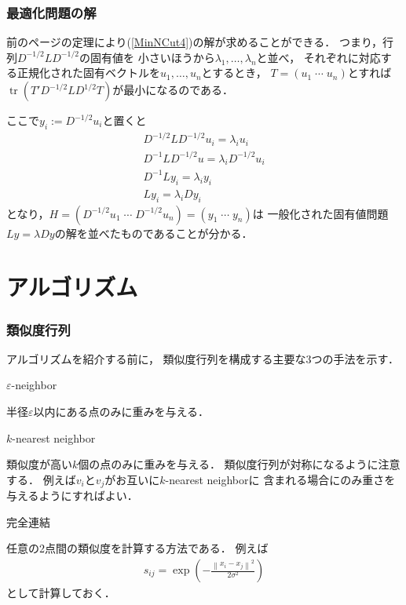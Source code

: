 \documentclass[10pt,hyperref={unicode}]{beamer}
\DeclareMathOperator*{\tr}{tr}
\newenvironment{wideenumerate}{\enumerate\addtolength{\itemsep}{1em}}{\endenumerate}
\newcommand{\pref}[1]{{\fontfamily{cmr}\selectfont (\ref{#1})}}
\newcommand{\parentheses}[1]{\left(#1\right)}
\newcommand{\norm}[1]{\left\|#1\right\|}
\begin{document}
\begin{frame}
\frametitle{最適化問題の解}
前のページの定理により\pref{MinNCut4}の解が求めることができる．
つまり，行列$D^{-1/2}LD^{-1/2}$の固有値を
小さいほうから$\lambda_1,\ldots,\lambda_n$と並べ，
それぞれに対応する正規化された固有ベクトルを$u_1,\ldots,u_n$とするとき，
$T = \parentheses{u_1 \; \cdots \; u_n}$とすれば
$\tr\parentheses{T'D^{-1/2}LD^{1/2}T}$が最小になるのである．

\bigskip

ここで$y_i := D^{-1/2}u_i$と置くと
\begin{gather*}
    D^{-1/2}LD^{-1/2}u_i = \lambda_i u_i \\
    D^{-1}LD^{-1/2}u = \lambda_i D^{-1/2}u_i \\
    D^{-1}Ly_i = \lambda_i y_i \\
    Ly_i = \lambda_i D y_i
\end{gather*}
となり，$H = \parentheses{D^{-1/2}u_1 \; \cdots \; D^{-1/2}u_n} = \parentheses{y_1 \; \cdots \; y_n}$は
一般化された固有値問題$L y = \lambda D y$の解を並べたものであることが分かる．
\end{frame}

\section{アルゴリズム}
\begin{frame}
\frametitle{類似度行列}
アルゴリズムを紹介する前に，
類似度行列を構成する主要な3つの手法を示す．

\bigskip

\begin{wideenumerate}
    \item $\varepsilon$-neighbor

        半径$\varepsilon$以内にある点のみに重みを与える．

    \item $k$-nearest neighbor

        類似度が高い$k$個の点のみに重みを与える．
        類似度行列が対称になるように注意する．
        例えば$v_i$と$v_j$がお互いに$k$-nearest neighborに
        含まれる場合にのみ重さを与えるようにすればよい．

    \item 完全連結

        任意の2点間の類似度を計算する方法である．
        例えば
        \begin{align*}
            s_{ij} = \exp\parentheses{- \frac{\norm{x_i - x_j}^2 }{2\sigma^2}}
        \end{align*}
        として計算しておく．
\end{wideenumerate}
\end{frame}
\end{document}
